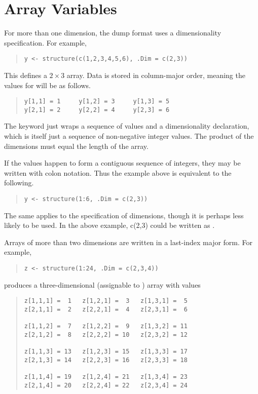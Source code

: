 \section{Array Variables}

For more than one dimension, the dump format uses a dimensionality
specification.  For example,
%
\begin{quote}
\begin{verbatim}
y <- structure(c(1,2,3,4,5,6), .Dim = c(2,3))
\end{verbatim}
\end{quote}
%
This defines a $2 \times 3$ array.  Data is stored in column-major
order, meaning the values for  will be as follows.
%
\begin{quote}
\begin{Verbatim}[fontsize=\small]
y[1,1] = 1     y[1,2] = 3     y[1,3] = 5    
y[2,1] = 2     y[2,2] = 4     y[2,3] = 6
\end{Verbatim}
\end{quote}
%
The  keyword just wraps a sequence of values and a
dimensionality declaration, which is itself just a sequence of
non-negative integer values.  The product of the dimensions must equal
the length of the array.

If the values happen to form a contiguous sequence of integers,
they may be written with colon notation.  Thus the example above is
equivalent to the following.
%
\begin{quote}
\begin{verbatim}
y <- structure(1:6, .Dim = c(2,3))
\end{verbatim}
\end{quote}
%
The same applies to the specification of dimensions, though it is
perhaps less likely to be used. In the above example,
c(2,3) could be written as .

Arrays of more than two dimensions are written in a last-index major form.
For example, 
%
\begin{quote}
\begin{verbatim}
z <- structure(1:24, .Dim = c(2,3,4))
\end{verbatim}
\end{quote}
%
produces a three-dimensional  (assignable to )
array  with values
%
\begin{quote}
\begin{verbatim}
z[1,1,1] =  1   z[1,2,1] =  3   z[1,3,1] =  5
z[2,1,1] =  2   z[2,2,1] =  4   z[2,3,1] =  6

z[1,1,2] =  7   z[1,2,2] =  9   z[1,3,2] = 11
z[2,1,2] =  8   z[2,2,2] = 10   z[2,3,2] = 12

z[1,1,3] = 13   z[1,2,3] = 15   z[1,3,3] = 17
z[2,1,3] = 14   z[2,2,3] = 16   z[2,3,3] = 18

z[1,1,4] = 19   z[1,2,4] = 21   z[1,3,4] = 23
z[2,1,4] = 20   z[2,2,4] = 22   z[2,3,4] = 24
\end{verbatim}
\end{quote}




